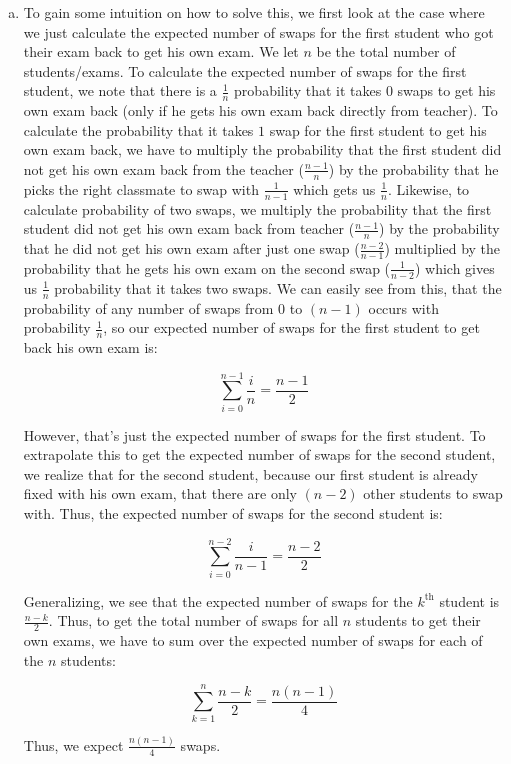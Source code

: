 \documentclass[12 pt]{article}
\begin{document}
\begin{enumerate}[a.]
	\item To gain some intuition on how to solve this, we first look at the case where we just calculate the expected number of swaps for the first student who got their exam back to get his own exam. We let $n$ be the total number of students/exams. To calculate the expected number of swaps for the first student, we note that there is a $\frac{1}{n}$ probability that it takes $0$ swaps to get his own exam back (only if he gets his own exam back directly from teacher). To calculate the probability that it takes $1$ swap for the first student to get his own exam back, we have to multiply the probability that the first student did not get his own exam back from the teacher ($\frac{n-1}{n}$) by the probability that he picks the right classmate to swap with $\frac{1}{n-1}$ which gets us $\frac{1}{n}$. Likewise, to calculate probability of two swaps, we multiply the probability that the first student did not get his own exam back from teacher ($\frac{n-1}{n}$) by the probability that he did not get his own exam after just one swap ($\frac{n-2}{n-1}$) multiplied by the probability that he gets his own exam on the second swap ($\frac{1}{n-2}$) which gives us $\frac{1}{n}$ probability that it takes two swaps. We can easily see from this, that the probability of any number of swaps from $0$ to $(n-1)$ occurs with probability $\frac{1}{n}$, so our expected number of swaps for the first student to get back his own exam is:
	
	\begin{equation}
		\sum_{i=0}^{n-1} \frac{i}{n} = \frac{n-1}{2}
	\end{equation} 
	
	\noindent However, that's just the expected number of swaps for the first student. To extrapolate this to get the expected number of swaps for the second student, we realize that for the second student, because our first student is already fixed with his own exam, that there are only $(n-2)$ other students to swap with. Thus, the expected number of swaps for the second student is:
	
	\begin{equation}
	\sum_{i=0}^{n-2} \frac{i}{n-1} = \frac{n-2}{2}
	\end{equation} 
	
	\noindent Generalizing, we see that the expected number of swaps for the $k^{\text{th}}$ student is $\frac{n-k}{2}$. Thus, to get the total number of swaps for all $n$ students to get their own exams, we have to sum over the expected number of swaps for each of the $n$ students:
	
	\begin{equation}
	\sum_{k=1}^n \frac{n-k}{2} = \frac{n(n-1)}{4} 
	\end{equation} 
	
	Thus, we expect $\frac{n(n-1)}{4}$ swaps.
	
	\end{enumerate}
\end{document}
